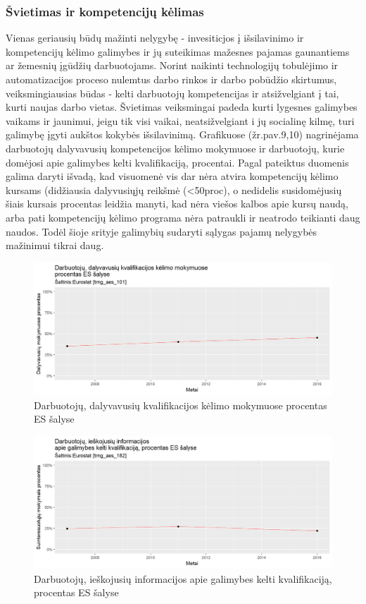 \documentclass[12pt,a4paper,titlepage]{article}
\begin{document}
\subsubsection{Švietimas ir kompetencijų kėlimas}
Vienas geriausių būdų mažinti nelygybę - invesiticjos į išsilavinimo ir kompetencijų kėlimo galimybes ir jų suteikimas mažesnes pajamas gaunantiems ar žemesnių įgūdžių darbuotojams. Norint naikinti technologijų tobulėjimo ir automatizacijos proceso nulemtus darbo rinkos ir darbo pobūdžio skirtumus, veiksmingiausias būdas - kelti darbuotojų kompetencijas ir atsižvelgiant į tai, kurti naujas darbo vietas. Švietimas veiksmingai padeda kurti lygesnes galimybes vaikams ir jaunimui, jeigu tik visi vaikai, neatsižvelgiant i jų socialinę kilmę, turi galimybę įgyti aukštos kokybės išsilavinimą.
Grafikuose (žr.pav.9,10) nagrinėjama darbuotojų dalyvavusių kompetencijos kėlimo mokymuose ir darbuotojų, kurie domėjosi apie galimybes kelti kvalifikaciją, procentai. Pagal pateiktus duomenis galima daryti išvadą, kad visuomenė vis dar nėra atvira kompetencijų kėlimo kursams (didžiausia dalyvusiųjų reikšmė (<50proc), o nedidelis susidomėjusių šiais kursais procentas leidžia manyti, kad nėra viešos kalbos apie kursų naudą, arba pati kompetencijų kėlimo programa nėra patraukli ir neatrodo teikianti daug naudos. Todėl šioje srityje galimybių sudaryti sąlygas pajamų nelygybės mažinimui tikrai daug.
\begin{figure}[H]
\includegraphics[scale=0.7]{participated.png}
\caption{Darbuotojų, dalyvavusių kvalifikacijos kėlimo mokymuose procentas ES šalyse}
\end{figure}

\begin{figure}[H]
\includegraphics[scale=0.7]{interested.png}
\caption{Darbuotojų, ieškojusių informacijos apie galimybes kelti kvalifikaciją, procentas ES šalyse}
\end{figure}
\end{document}
